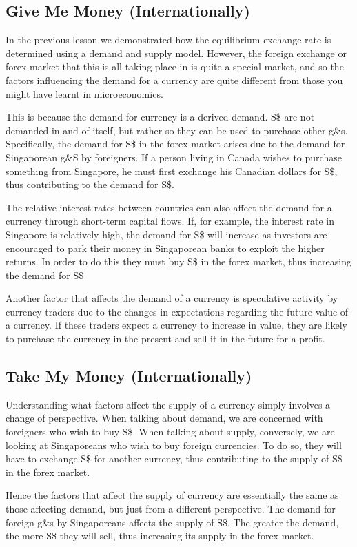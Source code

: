 \documentclass[DIV=calc,11pt,parskip,numbers=noenddot]{scrartcl} %
\begin{document}
\subsection{Give Me Money (Internationally)}
In the previous lesson we demonstrated how the equilibrium exchange rate is determined using a demand and supply model. However, the foreign exchange or forex market that this is all taking place in is quite a special market, and so the factors influencing the demand for a currency are quite different from those you might have learnt in microeconomics.

This is because the demand for currency is a derived demand. S\$ are not demanded in and of itself, but rather so they can be used to purchase other g\&s. Specifically, the demand for S\$ in the forex market arises due to the demand for Singaporean g\&S by foreigners. If a person living in Canada wishes to purchase something from Singapore, he must first exchange his Canadian dollars for S\$, thus contributing to the demand for S\$.

The relative interest rates between countries can also affect the demand for a currency through short-term capital flows. If, for example, the interest rate in Singapore is relatively high, the demand for S\$ will increase as investors are encouraged to park their money in Singaporean banks to exploit the higher returns. In order to do this they must buy S\$ in the forex market, thus increasing the demand for S\$

Another factor that affects the demand of a currency is speculative activity by currency traders due to the changes in expectations regarding the future value of a currency. If these traders expect a currency to increase in value, they are likely to purchase the currency in the present and sell it in the future for a profit.
\subsection{Take My Money (Internationally)}
Understanding what factors affect the supply of a currency simply involves a change of perspective. When talking about demand, we are concerned with foreigners who wish to buy S\$. When talking about supply, conversely, we are looking at Singaporeans who wish to buy foreign currencies. To do so, they will have to exchange S\$ for another currency, thus contributing to the supply of S\$ in the forex market.

Hence the factors that affect the supply of currency are essentially the same as those affecting demand, but just from a different perspective. The demand for foreign g\&s by Singaporeans affects the supply of S\$. The greater the demand, the more S\$ they will sell, thus increasing its supply in the forex market.
\end{document}

